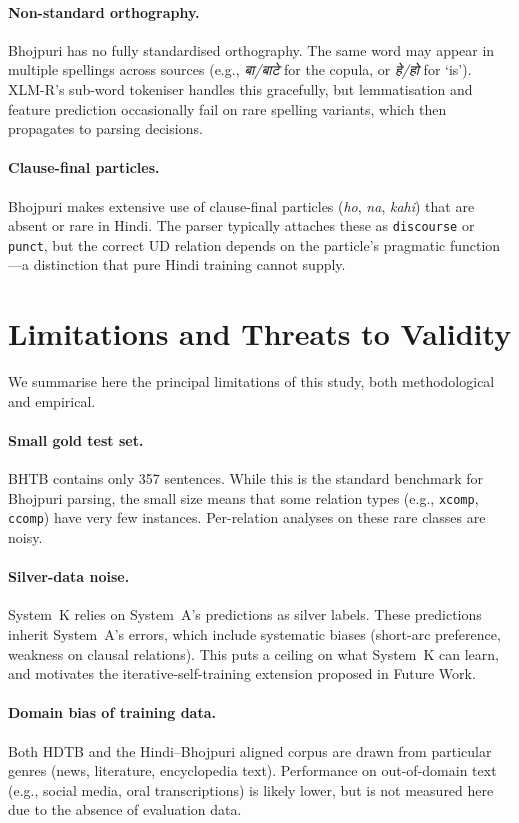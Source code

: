 \documentclass[12pt,a4paper,oneside]{report}
\begin{document}
\paragraph{Non-standard orthography.}
Bhojpuri has no fully standardised orthography. The same word may appear in
multiple spellings across sources (e.g., \textit{बा/बाटे} for the copula, or
\textit{हे/हो} for `is'). XLM-R's sub-word tokeniser handles this gracefully,
but lemmatisation and feature prediction occasionally fail on rare spelling
variants, which then propagates to parsing decisions.

\paragraph{Clause-final particles.}
Bhojpuri makes extensive use of clause-final particles (\textit{ho},
\textit{na}, \textit{kahi}) that are absent or rare in Hindi. The parser
typically attaches these as \texttt{discourse} or \texttt{punct}, but the
correct UD relation depends on the particle's pragmatic function---a distinction
that pure Hindi training cannot supply.

\section{Limitations and Threats to Validity}

We summarise here the principal limitations of this study, both methodological
and empirical.

\paragraph{Small gold test set.}
BHTB contains only 357 sentences. While this is the standard benchmark for
Bhojpuri parsing, the small size means that some relation types (e.g.,
\texttt{xcomp}, \texttt{ccomp}) have very few instances. Per-relation analyses
on these rare classes are noisy.

\paragraph{Silver-data noise.}
System~K relies on System~A's predictions as silver labels. These predictions
inherit System~A's errors, which include systematic biases (short-arc
preference, weakness on clausal relations). This puts a ceiling on what System~K
can learn, and motivates the iterative-self-training extension proposed in
Future Work.

\paragraph{Domain bias of training data.}
Both HDTB and the Hindi--Bhojpuri aligned corpus are drawn from particular
genres (news, literature, encyclopedia text). Performance on out-of-domain text
(e.g., social media, oral transcriptions) is likely lower, but is not measured
here due to the absence of evaluation data.
\end{document}
